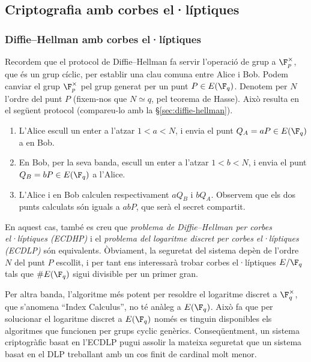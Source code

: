  
 
 \subsection{Criptografia amb corbes el·líptiques}
 
 \subsubsection{Diffie--Hellman amb corbes el·líptiques}
 Recordem que el protocol de Diffie--Hellman fa servir l'operació de grup a $\F_p^\times$, que és un grup cíclic, per establir una clau comuna entre Alice i Bob. Podem canviar el grup $\F_p^\times$ pel grup generat per un punt $P\in E(\F_q)$. Denotem per $N$ l'ordre del punt $P$ (fixem-nos que $N\simeq q$, pel teorema de Hasse). Això resulta en el següent protocol (compareu-lo amb la \S\ref{sec:diffie-hellman}).
 
 \begin{enumerate}
    \item L'Alice escull un enter a l'atzar $1<a<N$, i envia el punt $Q_A=aP\in E(\F_q)$ a en Bob.
    \item En Bob, per la seva banda, escull un enter a l'atzar $1<b<N$, i envia el punt $Q_B=bP\in E(\F_q)$ a l'Alice.
    \item L'Alice i en Bob calculen respectivament $aQ_B$ i $bQ_A$. Observem que els dos punts calculats són iguals a $abP$, que serà el secret compartit.
\end{enumerate}

En aquest cas, també es creu que \emph{problema de Diffie--Hellman per corbes el·líptiques (ECDHP)} i el \emph{problema del logaritme discret per corbes el·líptiques (ECDLP)} són equivalents. Òbviament, la seguretat del sistema depèn de l'ordre $N$ del punt $P$ escollit, i per tant ens interessarà trobar corbes el·líptiques $E/\F_q$ tals que $\#E(\F_q)$ sigui divisible per un primer gran.

Per altra banda, l'algoritme més potent per resoldre el logaritme discret a $\F_q^\times$, que s'anomena ``Index Calculus'', no té anàleg a $E(\F_q)$. Això fa que per solucionar el logaritme discret a $E(\F_q)$ només es tinguin disponibles els algoritmes que funcionen per grups cyclic genèrics. Conseqüentment, un sistema criptogràfic basat en l'ECDLP pugui assolir la mateixa seguretat que un sistema basat en el DLP treballant amb un cos finit de cardinal molt menor.

